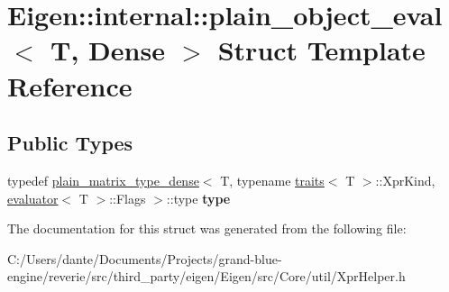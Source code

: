 \hypertarget{struct_eigen_1_1internal_1_1plain__object__eval_3_01_t_00_01_dense_01_4}{}\section{Eigen\+::internal\+::plain\+\_\+object\+\_\+eval$<$ T, Dense $>$ Struct Template Reference}
\label{struct_eigen_1_1internal_1_1plain__object__eval_3_01_t_00_01_dense_01_4}
\subsection*{Public Types}
\begin{DoxyCompactItemize}
\item 
\mbox{\label{struct_eigen_1_1internal_1_1plain__object__eval_3_01_t_00_01_dense_01_4_afac3e6affd89029108afafdc3e00f62d}} 
typedef \mbox{\hyperlink{struct_eigen_1_1internal_1_1plain__matrix__type__dense}{plain\+\_\+matrix\+\_\+type\+\_\+dense}}$<$ T, typename \mbox{\hyperlink{struct_eigen_1_1internal_1_1traits}{traits}}$<$ T $>$\+::Xpr\+Kind, \mbox{\hyperlink{struct_eigen_1_1internal_1_1evaluator}{evaluator}}$<$ T $>$\+::Flags $>$\+::type {\bfseries type}
\end{DoxyCompactItemize}


The documentation for this struct was generated from the following file\+:\begin{DoxyCompactItemize}
\item 
C\+:/\+Users/dante/\+Documents/\+Projects/grand-\/blue-\/engine/reverie/src/third\+\_\+party/eigen/\+Eigen/src/\+Core/util/Xpr\+Helper.\+h\end{DoxyCompactItemize}
